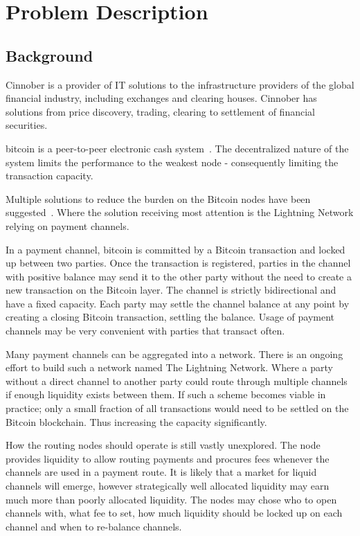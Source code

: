 \chapter{Problem Description}

\section{Background}
    \label{sec:background}

Cinnober is a provider of IT solutions to the infrastructure providers of the global financial industry, including exchanges and clearing houses. Cinnober has solutions from price discovery, trading, clearing to settlement of financial securities.

\gls{bitcoin} is a peer-to-peer electronic cash system~\cite{nakamoto:bitcoin}. The decentralized nature of the system limits the performance to the weakest node - consequently limiting the transaction capacity. 

Multiple solutions to reduce the burden on the Bitcoin nodes have been suggested~\cite{decker:wattenhofer:duplex, decker:russell:Osuntokun:eltoo, poon:dryja:lightning:network, blockstream:sidechain}. Where the solution receiving most attention is the \gls{Lightning Network} relying on payment channels.

In a payment channel, bitcoin is committed by a Bitcoin transaction and locked up between two parties. Once the transaction is registered, parties in the channel with positive balance may send it to the other party without the need to create a new transaction on the Bitcoin layer. The channel is strictly bidirectional and have a fixed capacity. Each party may settle the channel balance at any point by creating a closing Bitcoin transaction, settling the balance. Usage of payment channels may be very convenient with parties that transact often. 

Many payment channels can be aggregated into a network. There is an ongoing effort to build such a network named The Lightning Network. Where a party without a direct channel to another party could route through multiple channels if enough liquidity exists between them. If such a scheme becomes viable in practice;  only a small fraction of all transactions would need to be settled on the Bitcoin blockchain. Thus increasing the capacity significantly.

How the routing nodes should operate is still vastly unexplored. The node provides liquidity to allow routing payments and procures fees whenever the channels are used in a payment route. It is likely that a market for liquid channels will emerge, however strategically well allocated liquidity may earn much more than poorly allocated liquidity. The nodes may chose who to open channels with, what fee to set, how much liquidity should be locked up on each channel and when to re-balance channels.


